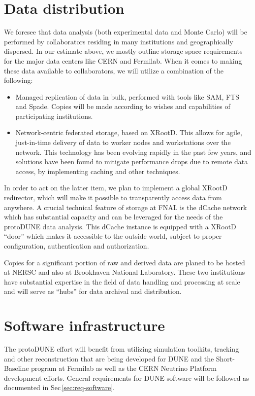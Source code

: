 \documentclass[12pt]{article}
\begin{document}
\section{Data distribution}
We foresee that data analysis (both experimental data and Monte Carlo) will be performed by collaborators residing in many 
institutions and geographically dispersed. In our
estimate above, we mostly outline storage space requirements for the
major data centers like CERN and Fermilab. When it comes to making these data available to collaborators, we will utilize a combination of the following:
\begin{itemize}
\item Managed replication of data in bulk, performed with tools like SAM, FTS and Spade. Copies will be made according to wishes and capabilities of participating institutions.
\item Network-centric federated storage, based on XRootD. This allows for agile, just-in-time delivery of data to worker nodes and workstations over the network. This
technology has been evolving rapidly in the past few years, and solutions have been found to mitigate performance drops due to remote data access, by implementing caching and other techniques.
\end{itemize}

\noindent In order to act on the latter item, we plan to implement a global XRootD redirector, which will make it possible to transparently access data from anywhere.
A crucial technical feature of storage at FNAL is the dCache network which has substantial capacity and can be leveraged
for the needs of the protoDUNE data analysis. This dCache instance is equipped with a XRootD ``door'' which makes it accessible to the outside world, subject
to proper configuration, authentication and authorization.


Copies for a significant portion of raw and derived data are planed to be hosted at NERSC and also at Brookhaven National Laboratory.
These two institutions have substantial expertise  in the field of data handling and processing at scale and will serve as ``hubs'' for data archival and distribution.


\section{Software infrastructure}

The protoDUNE effort will benefit from utilizing simulation toolkits, tracking and other reconstruction
that are being developed for DUNE and the Short-Baseline program at Fermilab as well as the 
CERN Neutrino Platform development efforts. General requirements for DUNE software will be followed
as documented in Sec\,\ref{sec:req-software}.
\end{document}
